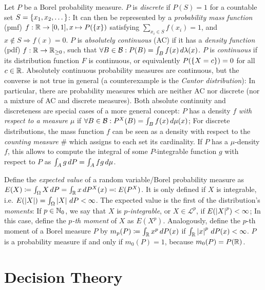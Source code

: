 \documentclass[a4paper]{scrreprt}
\newcommand{\Rp}{\mathbb{R}_{\geq 0}}
\newcommand{\B}{\mathcal{B}}
\theoremstyle{definition}
\begin{document}
    Let $P$ be a Borel probability measure.
    $P$ is \emph{discrete} if $P(S) = 1$ for a countable set $S = \{x_1, x_2, \dots\}$: It can then be represented by a \emph{probability mass function} (pmf) $f: \mathbb{R} \to [0, 1], x \mapsto P(\{x\})$ satisfying $\sum_{x_i \in S} f(x_i) = 1$, and $x \notin S \Rightarrow f(x) = 0$.
    $P$ is \emph{absolutely continuous} (AC) if it has a \emph{density function} (pdf) $f: \R \to \Rp$, such that $\forall B \in \B: P(B) = \lintegral{B}{f(x)}{\lambda(x)}$.
    $P$ is \emph{continuous} if its distribution function $F$ is continuous, or equivalently $P(\{X = c\}) = 0$ for all $c \in \mathbb{R}$.
    Absolutely continuous probability measures are continuous, but the converse is not true in general (a counterexample is the \emph{Cantor distribution}): In particular, there are probability measures which are neither AC nor discrete (nor a mixture of AC and discrete measures).
    Both absolute continuity and discreteness are special cases of a more general concept: $P$ has a density $f$ \emph{with respect to a measure $\mu$} if $\forall B \in \B: P^X(B) = \lintegral{B}{f(x)}{\mu(x)}$; For discrete distributions, the mass function $f$ can be seen as a density with respect to the \emph{counting measure} $\#$ which assigns to each set its cardinality.
    If $P$ has a $\mu$-density $f$, this allows to compute the integral of some $P$-integrable function $g$ with respect to $P$ as $\int_{A} g \, dP = \int_{A} f g \, d\mu$.
    
    Define the \emph{expected value} of a random variable/Borel probability measure as $E(X) \coloneqq \int_{\Omega} X \, dP = \int_{\mathbb{R}} x \, dP^X(x) \eqqcolon E(P^X)$. It is only defined if $X$ is integrable, i.e. $E(\left| X \right|) = \int_{\Omega} \left| X \right| \, dP < \infty$. 
    The expected value is the first of the distribution's \emph{moments}:
    If $p \in \mathbb{N}_0$, we say that $X$ is \emph{$p$-integrable}, or $X \in \mathcal{L}^p$, if $E(\left| X \right|^p) < \infty$;
    In this case, define the \emph{$p$-th moment} of $X$ as $E(X^p)$. Analogously, define the $p$-th moment of a Borel measure $P$ by $m_p(P) \coloneqq \int_{\mathbb{R}} x^p \, dP(x)$ if $\int_{\mathbb{R}} \left| x \right|^p \, dP(x) < \infty$. $P$ is a probability measure if and only if $m_0(P) = 1$, because $m_0(P) = P(\mathbb{R})$.
    
    
    \section{Decision Theory}
    
\end{document}
